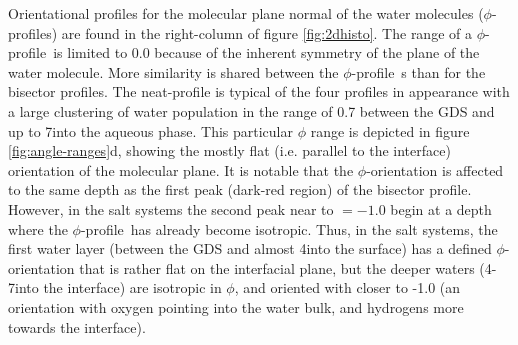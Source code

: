 

\newcommand{\phiprof}{$\phi$-profile~}

Orientational profiles for the molecular plane normal of the water molecules ($\phi$-profiles) are found in the right-column of figure \ref{fig:2dhisto}. The range of a \phiprof is limited to 0.0 because of the inherent symmetry of the plane of the water molecule. More similarity is shared between the \phiprof s than for the bisector profiles. The neat-\wat profile is typical of the four profiles in appearance with a large clustering of water population in the range of 0.7 between the GDS and up to 7\angs into the aqueous phase. This particular $\phi$ range is depicted in figure \ref{fig:angle-ranges}d, showing the mostly flat (i.e. parallel to the interface) orientation of the molecular plane. It is notable that the $\phi$-orientation is affected to the same depth as the first peak (dark-red region) of the bisector profile. However, in the salt systems the second peak near to \costheta$=-1.0$ begin at a depth where the \phiprof has already become isotropic. Thus, in the salt systems, the first water layer (between the GDS and almost 4\angs into the surface) has a defined $\phi$-orientation that is rather flat on the interfacial plane, but the deeper waters (4-7\angs into the interface) are isotropic in $\phi$, and oriented with \costheta closer to -1.0 (an orientation with oxygen pointing into the water bulk, and hydrogens more towards the interface).

